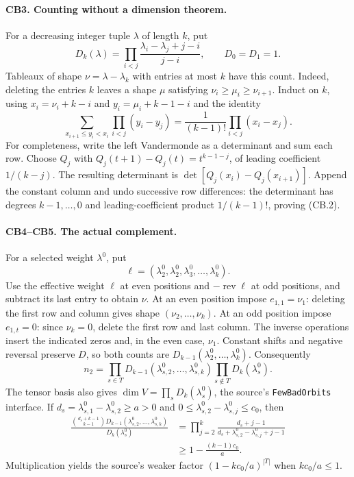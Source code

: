 \paragraph{CB3. Counting without a dimension theorem.}
For a decreasing integer tuple $\lambda$ of length $k$, put
\[
 D_k(\lambda)=\prod_{i<j}\frac{\lambda_i-\lambda_j+j-i}{j-i},\qquad D_0=D_1=1.
\]
Tableaux of shape $\nu=\lambda-\lambda_k$ with entries at most $k$ have this count.
Indeed, deleting the entries $k$ leaves a shape $\mu$ satisfying
$\nu_i\ge\mu_i\ge\nu_{i+1}$.
Induct on $k$, using $x_i=\nu_i+k-i$ and $y_i=\mu_i+k-1-i$ and the identity
\[
 \sum_{x_{i+1}\le y_i<x_i}\prod_{i<j}(y_i-y_j)
 =\frac{1}{(k-1)!}\prod_{i<j}(x_i-x_j). \tag{CB.2}
\]
For completeness, write the left Vandermonde as a determinant and sum each row.
Choose $Q_j$ with $Q_j(t+1)-Q_j(t)=t^{k-1-j}$, of leading coefficient $1/(k-j)$.
The resulting determinant is $\det[Q_j(x_i)-Q_j(x_{i+1})]$.
Append the constant column and undo successive row differences: the determinant has degrees $k-1,\ldots,0$ and leading-coefficient product $1/(k-1)!$, proving (CB.2).

\paragraph{CB4--CB5. The actual complement.}
For a selected weight $\lambda^0$, put
\[
 \ell=(\lambda^0_2,\lambda^0_2,\lambda^0_3,\ldots,\lambda^0_k).
\]
Use the effective weight $\ell$ at even positions and $-\operatorname{rev}\ell$ at odd positions, and subtract its last entry to obtain $\nu$.
At an even position impose $e_{1,1}=\nu_1$: deleting the first row and column gives shape $(\nu_2,\ldots,\nu_k)$.
At an odd position impose $e_{1,t}=0$: since $\nu_k=0$, delete the first row and last column.
The inverse operations insert the indicated zeros and, in the even case, $\nu_1$.
Constant shifts and negative reversal preserve $D$, so both counts are $D_{k-1}(\lambda^0_2,\ldots,\lambda^0_k)$.
Consequently
\[
 n_2=\prod_{s\in T}D_{k-1}(\lambda^0_{s,2},\ldots,\lambda^0_{s,k})
       \prod_{s\notin T}D_k(\lambda^0_s). \tag{CB.3}
\]
The tensor basis also gives $\dim V=\prod_sD_k(\lambda^0_s)$, the source's \texttt{FewBadOrbits} interface.
If $d_s=\lambda^0_{s,1}-\lambda^0_{s,2}\ge a>0$ and
$0\le\lambda^0_{s,2}-\lambda^0_{s,j}\le c_0$, then
\[
\begin{aligned}
 \frac{\binom{d_s+k-1}{k-1}D_{k-1}(\lambda^0_{s,2},\ldots,\lambda^0_{s,k})}{D_k(\lambda^0_s)}
 &=\prod_{j=2}^k\frac{d_s+j-1}{d_s+\lambda^0_{s,2}-\lambda^0_{s,j}+j-1}\\
 &\ge1-\frac{(k-1)c_0}{a}.
\end{aligned}
\]
Multiplication yields the source's weaker factor $(1-kc_0/a)^{|T|}$ when $kc_0/a\le1$.

